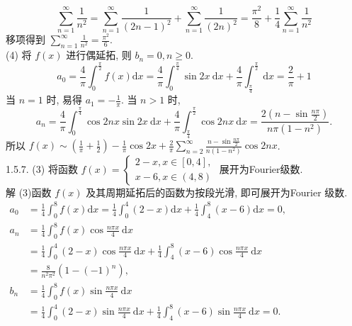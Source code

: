 \documentclass[a4paper,11pt,UTF8]{article}
\begin{document}
$$
\sum_{n=1}^{\infty} \frac{1}{n^2}=\sum_{n=1}^{\infty} \frac{1}{(2 n-1)^2}+\sum_{n=1}^{\infty} \frac{1}{(2 n)^2}=\frac{\pi^2}{8}+\frac{1}{4} \sum_{n=1}^{\infty} \frac{1}{n^2}
$$
移项得到 $\displaystyle \sum_{n=1}^{\infty} \frac{1}{n^2}=\frac{\pi^2}{6}$.\\
(4) 将 $\displaystyle f(x)$ 进行偶延拓, 则 $b_n=0, n \geq 0$.\\
$$
a_0=\frac{4}{\pi} \int_0^{\frac{\pi}{2}} f(x) \mathrm{d} x=\frac{4}{\pi} \int_0^{\frac{\pi}{4}} \sin 2 x \mathrm{~d} x+\frac{4}{\pi} \int_{\frac{\pi}{4}}^{\frac{\pi}{2}} \mathrm{~d} x=\frac{2}{\pi}+1
$$
当 $n=1$ 时, 易得 $\displaystyle a_1=-\frac{1}{\pi}$.
当 $n>1$ 时,
$$
a_n=\frac{4}{\pi} \int_0^{\frac{\pi}{4}} \cos 2 n x \sin 2 x \mathrm{~d} x+\frac{4}{\pi} \int_{\frac{\pi}{4}}^{\frac{\pi}{2}} \cos 2 n x \mathrm{~d} x=\frac{2\left(n-\sin \frac{n \pi}{2}\right)}{n \pi\left(1-n^2\right)} .
$$
所以 $\displaystyle f(x) \sim\left(\frac{1}{\pi}+\frac{1}{2}\right)-\frac{1}{\pi} \cos 2 x+\frac{2}{\pi} \sum_{n=2}^{\infty} \frac{n-\sin \frac{n \pi}{2}}{n\left(1-n^2\right)} \cos 2 n x$.\\
1.5.7. (3) 将函数 $\displaystyle f(x)=\left\{\begin{array}{l}2-x, x \in[0,4], \\ x-6, x \in(4,8)\end{array}\right.$ 展开为Fourier级数.\\
解 (3)函数 $\displaystyle f(x)$ 及其周期延拓后的函数为按段光滑, 即可展开为Fourier 级数.\\
$\displaystyle 
\begin{array}{rl}
	a_0&\displaystyle =\frac{1}{4} \int_0^8   f(x) \mathrm{d} x=\frac{1}{4} \int_0^4(2-x) \mathrm{d} x+\frac{1}{4} \int_4^8(x-6) \mathrm{d} x=0, \\
	a_n&\displaystyle  =\frac{1}{4} \int_0^8 f(x) \cos \frac{n \pi x}{4} \mathrm{~d} x \\
	&\displaystyle  =\frac{1}{4} \int_0^4(2-x) \cos \frac{n \pi x}{4} \mathrm{~d} x+\frac{1}{4} \int_4^8(x-6) \cos \frac{n \pi x}{4} \mathrm{~d} x \\
	&\displaystyle  =\frac{8}{n^2 \pi^2}\left(1-(-1)^n\right), \\
	b_n&\displaystyle  =\frac{1}{4} \int_0^8 f(x) \sin \frac{n \pi x}{4} \mathrm{~d} x\\
	   &\displaystyle =\frac{1}{4} \int_0^4(2-x) \sin \frac{n \pi x}{4} \mathrm{~d} x+\frac{1}{4} \int_4^8(x-6) \sin \frac{n \pi x}{4} \mathrm{~d} x=0 .
\end{array}
$\\
\end{document}
